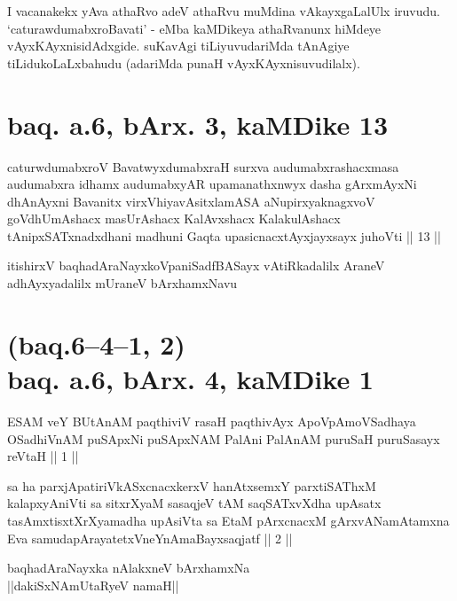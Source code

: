 \begin{artha}
I vacanakekx yAva athaRvo adeV athaRvu muMdina vAkayxgaLalUlx iruvudu. 
`caturawdumabxroBavati' - eMba kaMDikeya athaRvanunx hiMdeye 
vAyxKAyxnisidAdxgide. suKavAgi tiLiyuvudariMda tAnAgiye 
tiLidukoLaLxbahudu (adariMda punaH vAyxKAyxnisuvudilalx).
\end{artha}

\section*{baq. a.6, bArx. 3, kaMDike 13}

\begin{shl}
\footnotemark[3]caturwdumabxroV BavatwyxdumabxraH surxva audumabxrashacxmasa audumabxra idhamx audumabxyAR upamanathxnwyx dasha gArxmAyxNi dhAnAyxni Bavanitx virxVhiyavAsitxlamASA aNupirxyaknagxvoV goVdhUmAshacx masUrAshacx KalAvxshacx KalakulAshacx tAnipxSATxnadxdhani madhuni Gaqta upasicnacxtAyxjayxsayx juhoVti || 13 ||
\end{shl}

\begin{center}
itishirxV baqhadAraNayxkoVpaniSadfBASayx vAtiRkadalilx AraneV 
adhAyxyadalilx mUraneV bArxhamxNavu
\end{center}

\section*{(baq.6--4--1, 2)\\ baq. a.6, bArx. 4, kaMDike 1}

\begin{shl}
ESAM veY BUtAnAM paqthiviV rasaH paqthivAyx ApoV\s pAmoVSadhaya OSadhiVnAM puSApxNi puSApxNAM PalAni PalAnAM puruSaH puruSasayx reVtaH || 1 ||
\end{shl}

\begin{shl}
sa ha parxjApatiriVkASxcnacxkerxV hanAtxsemxY parxtiSAThxM kalapxyAniVti sa sitxrXyaM sasaqjeV tAM saqSATxvXdha upAsatx tasAmxtisxtXrXyamadha upAsiVta sa EtaM pArxcnacxM gArxvANamAtamxna Eva samudapArayatetxVneYnAmaBayxsaqjatf || 2 ||
\end{shl}

\begin{center}
baqhadAraNayxka nAlakxneV bArxhamxNa\\
||dakiSxNAmUtaRyeV namaH||
\end{center}

